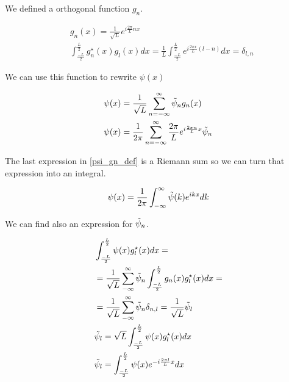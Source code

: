We defined a orthogonal function $g_n$.

\begin{equation}
    \label{gn_def}
    \begin{split}
        & g_n(x) = \frac{1}{\sqrt{L}}e^{i\frac{2\pi}{L}nx}\\
        & \int_{\frac{-L}{2}}^{\frac{L}{2}}g_{n}^{\star}(x)g_{l}(x) dx = \frac{1}{L}\int_{\frac{-L}{2}}^{\frac{L}{2}} e^{i\frac{2\pi x}{L}(l-n)}dx = \delta_{l,n}
    \end{split}
\end{equation}


We can use this function to rewrite $\psi(x)$

\begin{equation}
    \label{psi_gn_def}
\begin{split}
    &\psi(x) = \frac{1}{\sqrt{L}}\sum_{n=-\infty}^{\infty}\Tilde{\psi}_n g_n(x)\\
    &\psi(x) = \frac{1}{2\pi}\sum_{n=-\infty}^{\infty} \frac{2\pi}{L}e^{i\frac{2\pi n}{L}x}\Tilde{\psi}_n
    \end{split}
\end{equation}

The last expression in \ref{psi_gn_def} is a Riemann sum so we can turn that expression into an integral.

\begin{equation}
    \label{psi_gn_final}
\psi(x) = \frac{1}{2\pi} \int_{-\infty}^{\infty} \Tilde{\psi}(k)e^{ikx}dk
\end{equation}

We can find also an expression for $\Tilde{\psi}_n$.

\begin{equation}
    \label{til_psi_def_int}
\begin{split}
    & \int_{\frac{-L}{2}}^{\frac{L}{2}} \psi(x) g_l^{\star}(x) dx =
    \\
    & = \frac{1}{\sqrt{L}} \sum_{-\infty}^{\infty} \Tilde{\psi}_n\int_{\frac{-L}{2}}^{\frac{L}{2}} g_n(x) g_l^{\star}(x) dx =
    \\
    & = \frac{1}{\sqrt{L}} \sum_{-\infty}^{\infty} \Tilde{\psi}_n \delta_{n,l} = \frac{1}{\sqrt{L}} \Tilde{\psi}_l
    \\
    & \Tilde{\psi}_l = \sqrt{L} \int_{\frac{-L}{2}}^{\frac{L}{2}} \psi(x) g_l^{\star}(x) dx
    \\
    & \Tilde{\psi}_l = \int_{\frac{-L}{2}}^{\frac{L}{2}} \psi(x) e^{-i\frac{2\pi l}{L}x} dx
    \end{split}
\end{equation}

